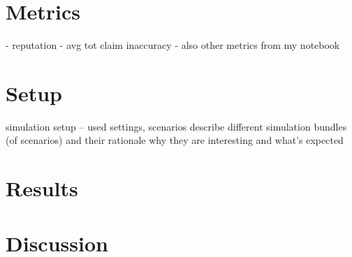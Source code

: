 \documentclass[%
    ]{\PathToTumTemplate/thesis/tum_thesis}
\begin{document}
\section{Metrics}\label{sec:metrics}

- reputation
- avg tot claim inaccuracy
- also other metrics from my notebook

\section{Setup}\label{sec:setup}

simulation setup -- used settings, scenarios
describe different simulation bundles (of scenarios) and their rationale
why they are interesting and what's expected

\section{Results}\label{sec:results}

\section{Discussion}\label{sec:discussion}
\end{document}
